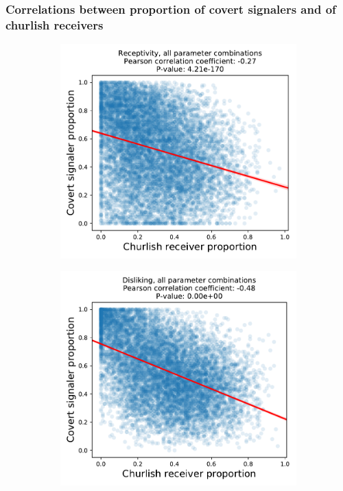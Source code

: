 \documentclass[11pt,letterpaper]{article}
\begin{document}
\subsubsection{Correlations between proportion of covert signalers and of churlish receivers}

\begin{figure}[H]
  \centering
  \begin{subfigure}{0.49\textwidth}
    \centering
    \includegraphics[width=\textwidth]{Figures/receptivity_allcombos_reg.pdf}
    \caption{}
    \label{fig:}
  \end{subfigure}
  \begin{subfigure}{0.49\textwidth}
    \centering
    \includegraphics[width=\textwidth]{Figures/disliking_allcombos_reg.pdf}

\end{subfigure}
\end{figure}
\end{document}
